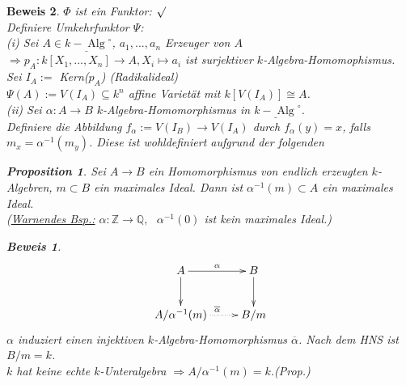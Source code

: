\documentclass[a4paper,12pt]{report}
\theoremstyle{break}
\newtheorem{Prop}[Def]{Proposition}
\theoremstyle{nonumberbreak}
\theoremstyle{nonumberplain}
\newtheorem{Bew}{Beweis}
\begin{document}
\begin{Bew}
$\Phi$ ist ein Funktor: $\surd$\\
Definiere Umkehrfunktor $\Psi$:~\\
(i) Sei $A\in \underline{k-\operatorname{Alg}}^{\circ}$, $a_1,...,a_n$ Erzeuger von $A$\\
$\Rightarrow p_A: k[X_1,...,X_n] \rightarrow A, X_i \mapsto a_i$ ist surjektiver $k$-Algebra-Homomophismus.\\
Sei $I_A:=$ Kern($p_A$) (Radikalideal)\\
$\Psi(A):= V(I_A)\subseteq k^n$ affine Varietät mit $k[V(I_A)]\cong A$.\\
(ii) Sei $\alpha: A\rightarrow B$ $k$-Algebra-Homomorphismus in $\underline{k-\operatorname{Alg}}^{\circ}$.\\
Definiere die Abbildung $f_{\alpha} := V(I_B) \rightarrow V(I_A)$ durch $f_{\alpha}(y)=x$, falls $m_x=\alpha^{-1}(m_y)$. Diese ist wohldefiniert aufgrund der folgenden 
\begin{Prop}
Sei $A\rightarrow B$ ein Homomorphismus von endlich erzeugten $k$-Algebren, $m\subset B$ ein maximales Ideal. Dann ist $\alpha^{-1}(m)\subset A$ ein maximales Ideal.\\
(\underline{Warnendes Bsp.:} $\alpha:\mathbb{Z}\rightarrow \mathbb{Q},~~~ \alpha^{-1}(0)$ ist kein maximales Ideal.) 
\end{Prop}
\begin{Bew}
\[
\begin{xy}
\xymatrix{
A\ar[r]^{\alpha}\ar[d]&B\ar[d] \\
A/\alpha^{-1}(m)\ar@{.>}[r]^{\overline{\alpha}}&B/m
}
\end{xy}
\]
$\alpha$ induziert einen injektiven $k$-Algebra-Homomorphismus $\overline{\alpha}$. Nach dem HNS ist $B/m=k$.\\
$k$ hat keine echte $k$-Unteralgebra $\Rightarrow A/\alpha^{-1}(m)=k$.(Prop.)\\
\end{Bew}

\end{Bew}
\end{document}
